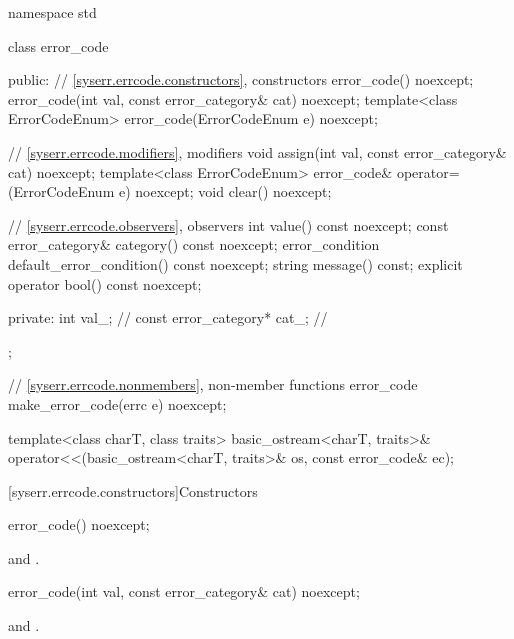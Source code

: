 %
\begin{codeblock}
namespace std {
  class error_code {
  public:
    // \ref{syserr.errcode.constructors}, constructors
    error_code() noexcept;
    error_code(int val, const error_category& cat) noexcept;
    template<class ErrorCodeEnum>
      error_code(ErrorCodeEnum e) noexcept;

    // \ref{syserr.errcode.modifiers}, modifiers
    void assign(int val, const error_category& cat) noexcept;
    template<class ErrorCodeEnum>
      error_code& operator=(ErrorCodeEnum e) noexcept;
    void clear() noexcept;

    // \ref{syserr.errcode.observers}, observers
    int value() const noexcept;
    const error_category& category() const noexcept;
    error_condition default_error_condition() const noexcept;
    string message() const;
    explicit operator bool() const noexcept;

  private:
    int val_;                   // \expos
    const error_category* cat_; // \expos
  };

  // \ref{syserr.errcode.nonmembers}, non-member functions
  error_code make_error_code(errc e) noexcept;

  template<class charT, class traits>
    basic_ostream<charT, traits>&
      operator<<(basic_ostream<charT, traits>& os, const error_code& ec);
}
\end{codeblock}

[syserr.errcode.constructors]{Constructors}

%
\begin{itemdecl}
error_code() noexcept;
\end{itemdecl}

\begin{itemdescr}
\pnum
{}

\pnum
\ensures {} and .
\end{itemdescr}

%
\begin{itemdecl}
error_code(int val, const error_category& cat) noexcept;
\end{itemdecl}

\begin{itemdescr}
\pnum
{}

\pnum
\ensures {} and .
\end{itemdescr}

